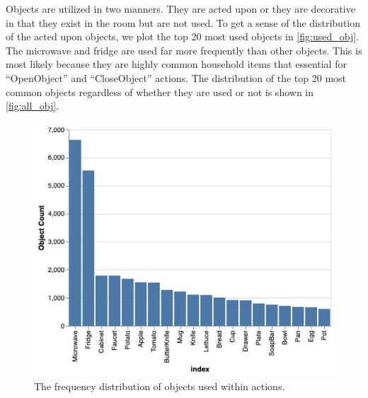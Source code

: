 \documentclass[11pt,a4paper]{article}
\begin{document}
Objects are utilized in two manners. They are acted upon or they are decorative in that they exist in the room but are not used. To get a sense of the distribution of the acted upon objects, we plot the top 20 most used objects in \autoref{fig:used_obj}. The microwave and fridge are used far more frequently than other objects. This is most likely because they are highly common household items that essential for ``OpenObject'' and ``CloseObject'' actions. The distribution of the top 20 most common objects regardless of whether they are used or not is shown in \autoref{fig:all_obj}.

\begin{figure}
    \centering
    \includegraphics[width=\linewidth]{Reports/1-Task-Definition-and-Data/used_objects.png}
    \caption{The frequency distribution of objects used within actions.}
    \label{fig:used_obj}
\end{figure}
\end{document}
